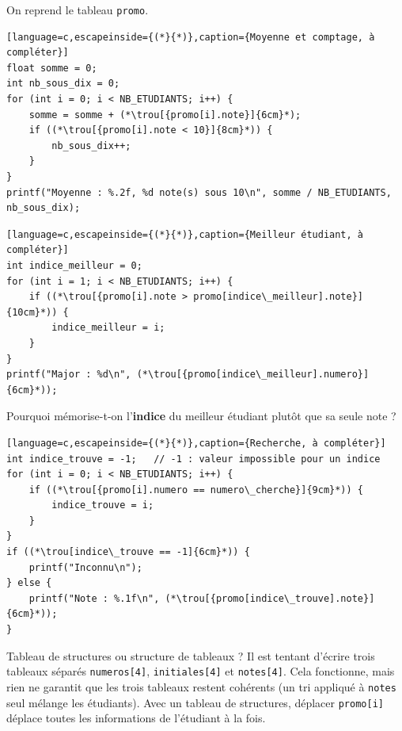 \begin{UPSTIactivite}
On reprend le tableau \texttt{promo}.
\begin{lstlisting}[language=c,escapeinside={(*}{*)},caption={Moyenne et comptage, à compléter}]
float somme = 0;
int nb_sous_dix = 0;
for (int i = 0; i < NB_ETUDIANTS; i++) {
    somme = somme + (*\trou[{promo[i].note}]{6cm}*);
    if ((*\trou[{promo[i].note < 10}]{8cm}*)) {
        nb_sous_dix++;
    }
}
printf("Moyenne : %.2f, %d note(s) sous 10\n", somme / NB_ETUDIANTS, nb_sous_dix);
\end{lstlisting}
\begin{lstlisting}[language=c,escapeinside={(*}{*)},caption={Meilleur étudiant, à compléter}]
int indice_meilleur = 0;
for (int i = 1; i < NB_ETUDIANTS; i++) {
    if ((*\trou[{promo[i].note > promo[indice\_meilleur].note}]{10cm}*)) {
        indice_meilleur = i;
    }
}
printf("Major : %d\n", (*\trou[{promo[indice\_meilleur].numero}]{6cm}*));
\end{lstlisting}
Pourquoi mémorise-t-on l'\textbf{indice} du meilleur étudiant plutôt que sa seule note ? 
\end{UPSTIactivite}

\begin{UPSTIactivite}
\begin{lstlisting}[language=c,escapeinside={(*}{*)},caption={Recherche, à compléter}]
int indice_trouve = -1;   // -1 : valeur impossible pour un indice
for (int i = 0; i < NB_ETUDIANTS; i++) {
    if ((*\trou[{promo[i].numero == numero\_cherche}]{9cm}*)) {
        indice_trouve = i;
    }
}
if ((*\trou[indice\_trouve == -1]{6cm}*)) {
    printf("Inconnu\n");
} else {
    printf("Note : %.1f\n", (*\trou[{promo[indice\_trouve].note}]{6cm}*));
}
\end{lstlisting}
\end{UPSTIactivite}

\begin{UPSTIwarning}{Tableau de structures ou structure de tableaux ?}
  Il est tentant d'écrire trois tableaux séparés \texttt{numeros[4]}, \texttt{initiales[4]} et \texttt{notes[4]}. Cela fonctionne, mais rien ne garantit que les trois tableaux restent cohérents (un tri appliqué à \texttt{notes} seul mélange les étudiants). Avec un tableau de structures, déplacer \texttt{promo[i]} déplace toutes les informations de l'étudiant à la fois.
\end{UPSTIwarning}

